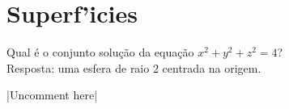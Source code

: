 \documentclass{article}
\begin{document}
\pagebreak
\section{Superf\a'icies}
Qual \'e o conjunto solu\c{c}\~ao da equa\c{c}\~ao $x^2 + y^2 + z^2 = 4$? \\[5pt]
Resposta: uma esfera de raio 2 centrada na origem. \\[5pt]
\centerline{|Uncomment here|}
\end{document}
